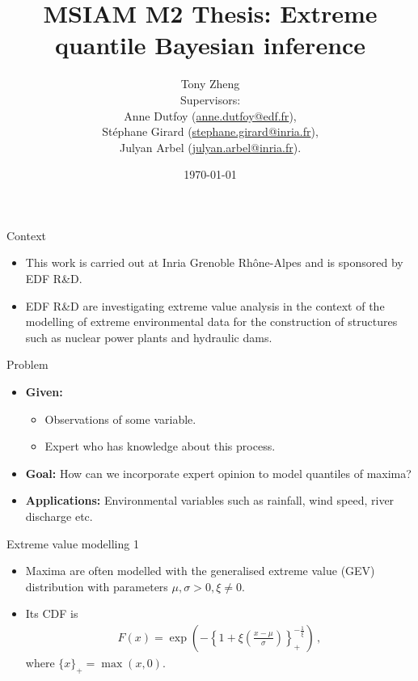 \documentclass[10pt]{beamer}
\title[%
	MSIAM M2 Thesis: Extreme quantile Bayesian estimators]
{%
	\textbf{MSIAM M2 Thesis: Extreme quantile Bayesian inference}}
\subtitle[]{}
\author[Tony Zheng]{Tony Zheng \\ \vspace{10mm}
\scriptsize{Supervisors: \\
	Anne Dutfoy (\href{mailto:anne.dutfoy@edf.fr}{anne.dutfoy@edf.fr}), \\
	Stéphane Girard
		(\href{mailto:stephane.girard@inria.fr}{stephane.girard@inria.fr}), \\ \vspace{-1.5mm}
	Julyan Arbel (\href{mailto:julyan.arbel@inria.fr}{julyan.arbel@inria.fr}).}
}
\institute[]{}
\date{\today}
\begin{document}
%
{\1\begin{frame}\titlepage\end{frame}}
%
%
\begin{frame}{Context}{}
%
\begin{itemize}
	\item This work is carried out at Inria Grenoble Rhône-Alpes
	and is sponsored by EDF R\&D.
	\item EDF R\&D are investigating extreme value analysis
	in the context of the modelling
	of extreme environmental data
	for the construction of structures
	such as nuclear power plants and hydraulic dams.
\end{itemize}
%
\end{frame}
%
%
\begin{frame}{Problem}{}
%
\begin{itemize}
	\item[] \textbf{Given:}
		\begin{itemize}
			\item Observations of some variable.
			\item Expert who has knowledge about this process.
		\end{itemize}
	\item[] \textbf{Goal:} How can we incorporate expert opinion
		to model quantiles of maxima?
	\item[] \textbf{Applications:} Environmental variables such as
	rainfall, wind speed, river discharge etc.
\end{itemize}
%
\end{frame}
%
%
\begin{frame}{Extreme value modelling 1}{}
%
\begin{itemize}
	\item Maxima are often modelled with the
		generalised extreme value (GEV)
		distribution with parameters $\mu, \sigma > 0, \xi \neq 0$.
	\item Its CDF is
		\begin{align*}
			F(x) =
				\exp\left(-\left\{1 + \xi
				\left(\frac{x - \mu}{\sigma}\right)\right\}_+
				^ {-\frac{1}{\xi}}\right) \,,
		\end{align*}
		where $\{x\}_+ = \max(x, 0)$.
\end{itemize}
%
\end{frame}
%
\end{document}
